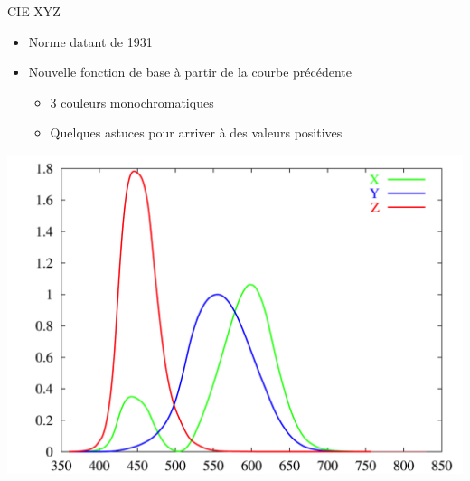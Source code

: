 \begin{frame}{CIE XYZ}
\begin{itemize}
\item Norme datant de 1931
\item Nouvelle fonction de base à partir de la courbe précédente
\begin{itemize}
\item 3 couleurs monochromatiques
\item Quelques astuces pour arriver à des valeurs positives
\end{itemize}
\end{itemize}
\begin{center}
\includegraphics[height=.4\textheight]{figs/cie-xyz.png}
\end{center}
\end{frame}

